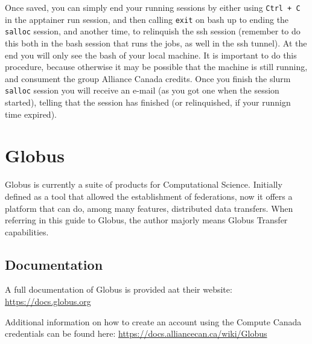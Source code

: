 \documentclass[
]{book}
\begin{document}
Once saved, you can simply end your running sessions by either using \texttt{Ctrl\ +\ C} in the apptainer run session, and then calling \texttt{exit} on bash up to ending the \texttt{salloc} session, and another time, to relinquish the ssh session (remember to do this both in the bash session that runs the jobs, as well in the ssh tunnel). At the end you will only see the bash of your local machine. It is important to do this procedure, because otherwise it may be possible that the machine is still running, and consument the group Alliance Canada credits. Once you finish the slurm \texttt{salloc} session you will receive an e-mail (as you got one when the session started), telling that the session has finished (or relinquished, if your runnign time expired).

\hypertarget{globus}{%
\chapter{Globus}\label{globus}}

Globus is currently a suite of products for Computational Science.
Initially defined as a tool that allowed the establishment of federations,
now it offers a platform that can do, among many features, distributed data
transfers. When referring in this guide to Globus, the author majorly means
Globus Transfer capabilities.

\hypertarget{documentation}{%
\section{Documentation}\label{documentation}}

A full documentation of Globus is provided aat their website: \url{https://docs.globus.org}

Additional information on how to create an account using the Compute Canada credentials can be found here: \url{https://docs.alliancecan.ca/wiki/Globus}

  
\end{document}
